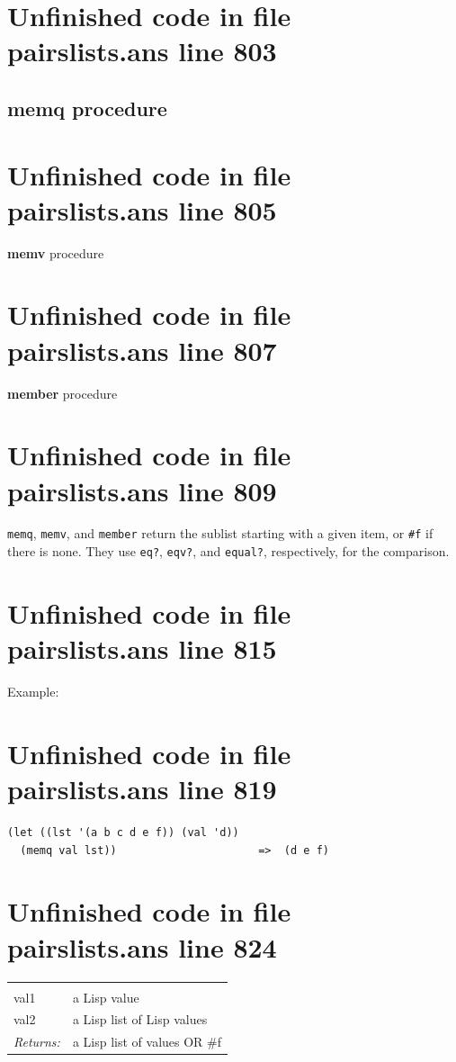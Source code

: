 \documentclass[twoside,9pt]{report}
\begin{document}
\section{Unfinished code in file pairslists.ans line 803}
\subsection{memq procedure}
\label{memq-procedure}
\section{Unfinished code in file pairslists.ans line 805}

\noindent \textbf{memv} procedure

\section{Unfinished code in file pairslists.ans line 807}

\noindent \textbf{member} procedure

\section{Unfinished code in file pairslists.ans line 809}


\texttt{memq}, \texttt{memv}, and \texttt{member} return the sublist starting with a given item, or \texttt{\#f} if there is none. They use \texttt{eq?}, \texttt{eqv?}, and \texttt{equal?}, respectively, for the comparison.

\section{Unfinished code in file pairslists.ans line 815}


Example:

\section{Unfinished code in file pairslists.ans line 819}
\begin{verbatim}
(let ((lst '(a b c d e f)) (val 'd))
  (memq val lst))                      =>  (d e f)
\end{verbatim}
\section{Unfinished code in file pairslists.ans line 824}
\noindent\begin{tabular}{ |p{1.9cm} p{8cm}| }
\hline
\rowcolor[HTML]{CCCCCC} \multicolumn{2}{|l|}{\bf memq (public)} \\
val1 & a Lisp value \\
val2 & a Lisp list of Lisp values \\
\textit{Returns:} & a Lisp list of values OR \#f \\
\hline
\end{tabular}
\end{document}
